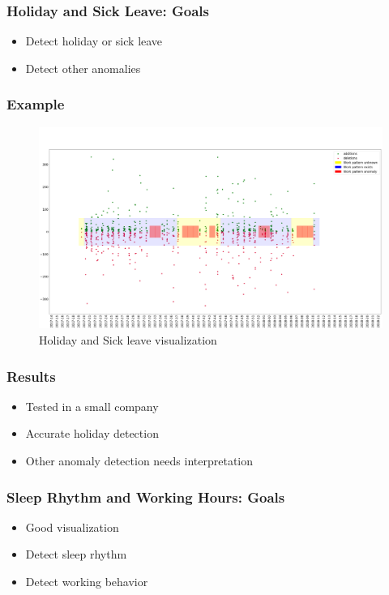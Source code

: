 \documentclass[t]{beamer}
\begin{document}
\begin{frame}
    \frametitle{Holiday and Sick Leave: Goals}
    \vspace{1cm}
    \begin{itemize}
        \item Detect holiday or sick leave
        \pause{}
        \item Detect other anomalies
    \end{itemize}
\end{frame}

\begin{frame}
    \frametitle{Example}
    \begin{figure}[H]
        \includegraphics[scale=0.115]{analysis/work-time-analysis}
        \centering
        \caption{Holiday and Sick leave visualization}
    \end{figure}
\end{frame}

\begin{frame}
    \frametitle{Results}
    \vspace{1cm}
    \begin{itemize}
        \item Tested in a small company
        \pause{}
        \item Accurate holiday detection
        \pause{}
        \item Other anomaly detection needs interpretation
    \end{itemize}
\end{frame}

\begin{frame}
    \frametitle{Sleep Rhythm and Working Hours: Goals}
    \begin{itemize}
        \item Good visualization
        \pause{}
        \item Detect sleep rhythm
        \pause{}
        \item Detect working behavior
    \end{itemize}
\end{frame}
\end{document}
